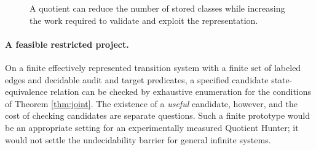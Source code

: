 \documentclass[11pt,letterpaper]{article}
\theoremstyle{definition}
\begin{document}
\begin{figure}[htbp]\centering
{}
\caption{A quotient can reduce the number of stored classes while increasing the work required to validate and exploit the representation.}
\label{fig:charged}
\end{figure}

\paragraph{A feasible restricted project.} On a finite effectively represented transition system with a finite set of labeled edges and decidable audit and target predicates, a specified candidate state-equivalence relation can be checked by exhaustive enumeration for the conditions of Theorem \ref{thm:joint}. The existence of a \emph{useful} candidate, however, and the cost of checking candidates are separate questions. Such a finite prototype would be an appropriate setting for an experimentally measured Quotient Hunter; it would not settle the undecidability barrier for general infinite systems.
\end{document}
